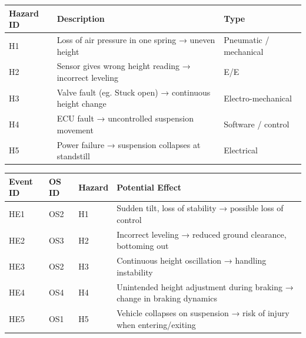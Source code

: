 \begin{solutionblock}
    \begin{table}[ht]
        \centering
        \begin{tabular}{ | m{5em} | m{8cm}| m{4cm} | }
            \hline
            Hazard ID & Description & Type \\
            \hline \hline
            H1 & Loss of air pressure in one spring → uneven height & Pneumatic / mechanical\\
            \hline
            H2 & Sensor gives wrong height reading → incorrect leveling & E/E\\
            \hline
            H3 & Valve fault (eg. Stuck open) → continuous height change & Electro-mechanical\\
            \hline
            H4 & ECU fault → uncontrolled suspension movement & Software / control\\
            \hline
            H5 & Power failure → suspension collapses at standstill & Electrical\\
            \hline
        \end{tabular}
    \end{table}
\end{solutionblock}


\begin{solutionblock}
    \begin{table}[ht]
        \centering
        \begin{tabular}{ | m{5em} | m{5em}| m{5em} | m{8cm} | }
            \hline
            Event ID & OS ID & Hazard & Potential Effect \\
            \hline \hline
            HE1 & OS2 & H1 & Sudden tilt, loss of stability → possible loss of control\\
            \hline
            HE2 & OS3 & H2 & Incorrect leveling → reduced ground clearance, bottoming out\\
            \hline
            HE3 & OS2 & H3 & Continuous height oscillation → handling instability\\
            \hline
            HE4 & OS4 & H4 & Unintended height adjustment during braking → change in braking dynamics\\
            \hline
            HE5 & OS1 & H5 & Vehicle collapses on suspension → risk of injury when entering/exiting\\
            \hline
        \end{tabular}
    \end{table}
\end{solutionblock}


